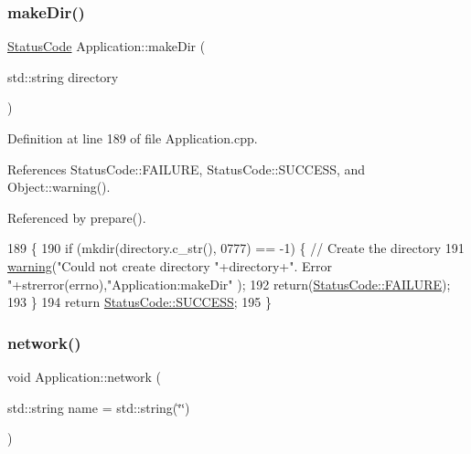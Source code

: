 \subsubsection{\texorpdfstring{make\+Dir()}{makeDir()}}
{\footnotesize\ttfamily \hyperlink{classStatusCode}{Status\+Code} Application\+::make\+Dir (\begin{DoxyParamCaption}\item[{std\+::string}]{directory }\end{DoxyParamCaption})}



Definition at line 189 of file Application.\+cpp.



References Status\+Code\+::\+F\+A\+I\+L\+U\+RE, Status\+Code\+::\+S\+U\+C\+C\+E\+SS, and Object\+::warning().



Referenced by prepare().


\begin{DoxyCode}
189                                                      \{
190   \textcolor{keywordflow}{if} (mkdir(directory.c\_str(), 0777) == -1) \{ \textcolor{comment}{// Create the directory}
191     \hyperlink{classObject_a65cd4fda577711660821fd2cd5a3b4c9}{warning}(\textcolor{stringliteral}{"Could not create directory "}+directory+\textcolor{stringliteral}{". Error "}+strerror(errno),\textcolor{stringliteral}{"Application:makeDir"}
      );
192     \textcolor{keywordflow}{return}(\hyperlink{classStatusCode_a6f565cbeadc76d14c72f047e5e85eb4ba3da73d4c469762eb9d3c960368252b26}{StatusCode::FAILURE});
193   \}
194   \textcolor{keywordflow}{return} \hyperlink{classStatusCode_a6f565cbeadc76d14c72f047e5e85eb4badd0da38d3ba0d922efd1f4619bc37ad8}{StatusCode::SUCCESS};
195 \}
\end{DoxyCode}
\mbox{\label{classApplication_ab21cc0c86ca4e63d1fbd348d709dcddc}} 
\subsubsection{\texorpdfstring{network()}{network()}}
{\footnotesize\ttfamily void Application\+::network (\begin{DoxyParamCaption}\item[{std\+::string}]{name = {\ttfamily std\+:\+:string(\char`\"{}\char`\"{})} }\end{DoxyParamCaption})}



